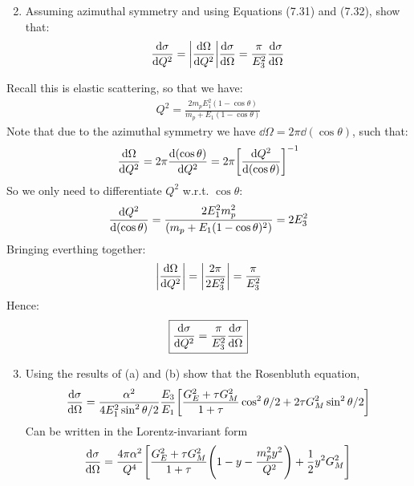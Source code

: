 \documentclass[12pt]{article}
\begin{document}
\begin{problem}
  \begin{enumerate}[label = (\alph*)]
    \setcounter{enumi}{1}
  \item Assuming azimuthal symmetry and using Equations (7.31) and (7.32), show that:
    \begin{align*}
      \dv{\sigma}{Q^2}=\abs{\dv{\Omega}{Q^2}}\dv{\sigma}{\Omega}
      =\frac{\pi}{E_3^2}\dv{\sigma}{\Omega}
    \end{align*}
  \end{enumerate}
\end{problem}
Recall this is elastic scattering, so that we have:
\begin{align*}
  Q^2=\frac{2m_p E_1^2(1-\cos\theta)}{m_p+E_1(1-\cos\theta)}
\end{align*}
Note that due to the azimuthal symmetry we have $\dd{\Omega}=2\pi\dd{(\cos\theta)}$, such that:
\begin{align*}
  \dv{\Omega}{Q^2}=2\pi\dv{(\cos\theta)}{Q^2}
  =2\pi\qty[\dv{Q^2}{(\cos\theta)}]^{-1}
\end{align*}
So we only need to differentiate $Q^2$ w.r.t. $\cos\theta$:
\begin{align*}
  \dv{Q^2}{(\cos\theta)}=\frac{2E_1^2m_p^2}{(m_p+E_1(1-\cos\theta)^2)}=2E_3^2
\end{align*}
Bringing everthing together:
\begin{align*}
  \abs{\dv{\Omega}{Q^2}}=\abs{\frac{2\pi}{2E_3^2}}=\frac{\pi}{E_3^2}
\end{align*}
Hence:
\begin{equation}
  \label{eq:p4b}
  \boxed{\dv{\sigma}{Q^2}=\frac{\pi}{E_3^2}\dv{\sigma}{\Omega}}
\end{equation}
\begin{problem}
  \begin{enumerate}[label = (\alph*)]
    \setcounter{enumi}{2}
  \item Using the results of (a) and (b) show that the Rosenbluth equation,
    \begin{align*}
      \dv{\sigma}{\Omega}=\frac{\alpha^2}{4E_1^2\sin^2\theta/2}\frac{E_3}{E_1}
      \qty[\frac{G_E^2+\tau G_M^2}{1+\tau}\cos^2\theta/2
      +2\tau G_M^2\sin^2\theta/2]
    \end{align*}
    Can be written in the Lorentz-invariant form
    \begin{align*}
      \dv{\sigma}{\Omega}=\frac{4\pi\alpha^2}{Q^4}
      \qty[\frac{G_E^2+\tau G_M^2}{1+\tau}\qty(1-y-\frac{m_p^2y^2}{Q^2})
      +\frac12 y^2G_M^2]
    \end{align*}
  \end{enumerate}
\end{problem}
\end{document}
